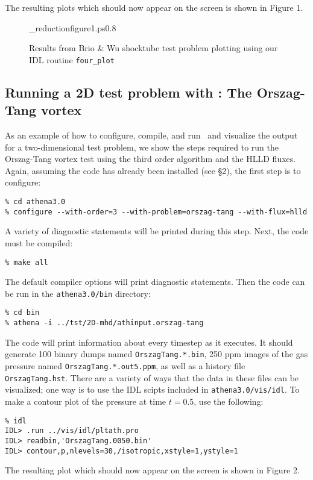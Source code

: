The resulting plots which should now appear on the screen is shown in Figure 1. 

\begin{figure}[htb!]
\plotone_reduction{figure1.ps}{0.8}
\caption{Results from Brio \& Wu shocktube test problem plotting using our
IDL routine {\tt four\_plot}}
\end{figure}

\subsection{Running a 2D test problem with \ath: The Orszag-Tang vortex}

As an example of how to configure, compile, and run \ath\ and visualize
the output for a two-dimensional test problem, we show the steps required
to run the Orszag-Tang vortex test using the third order algorithm and the
HLLD fluxes.
Again, assuming the code has already been
installed (see \S2), the first step is to configure:
\begin{verbatim}
% cd athena3.0
% configure --with-order=3 --with-problem=orszag-tang --with-flux=hlld
\end{verbatim}
A variety of diagnostic statements will be printed during
this step.  Next, the code must be compiled:
\begin{verbatim}
% make all
\end{verbatim}
The default compiler options will print diagnostic statements.  Then
the code can be run in the {\tt athena3.0/bin} directory:
\begin{verbatim}
% cd bin
% athena -i ../tst/2D-mhd/athinput.orszag-tang
\end{verbatim}
The code will print information about every timestep as it executes.  It
should generate 100 binary dumps named {\tt OrszagTang.*.bin}, 250 ppm 
images of the gas pressure named {\tt OrszagTang.*.out5.ppm},
as well as a history file {\tt OrszagTang.hst}.  There
are a variety of ways that the data in these files can be visualized; one
way is to use the IDL scipts included in {\tt athena3.0/vis/idl}.  To make a
contour plot of the pressure at time $t=0.5$, use the following:
\begin{verbatim}
% idl
IDL> .run ../vis/idl/pltath.pro
IDL> readbin,'OrszagTang.0050.bin'
IDL> contour,p,nlevels=30,/isotropic,xstyle=1,ystyle=1
\end{verbatim}

The resulting plot which should now appear on the screen is shown in Figure 2. 

